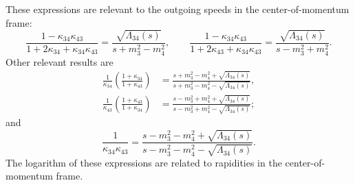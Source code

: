These expressions are relevant to the outgoing speeds in the center-of-momentum frame:
\begin{equation}
	\frac{1 - \kappa_{34} \kappa_{43}}{1 + 2 \kappa_{34} + \kappa_{34} \kappa_{43}} = \frac{\sqrt{\Lambda_{34}(s)}}{s + m_{3}^{2} - m_{4}^{2}}, \qquad \frac{1 - \kappa_{34} \kappa_{43}}{1 + 2 \kappa_{43} + \kappa_{34} \kappa_{43}} = \frac{\sqrt{\Lambda_{34}(s)}}{s - m_{3}^{2} + m_{4}^{2}}.
\end{equation}
Other relevant results are
\begin{align}
	\frac{1}{\kappa_{34}} \left( \frac{1 + \kappa_{34}}{1 + \kappa_{43}} \right) &= \frac{s + m_{3}^{2} - m_{4}^{2} + \sqrt{\Lambda_{34}(s)}}{s + m_{3}^{2} - m_{4}^{2} - \sqrt{\Lambda_{34}(s)}}, \\
	\frac{1}{\kappa_{43}} \left( \frac{1 + \kappa_{43}}{1 + \kappa_{34}} \right) &= \frac{s - m_{3}^{2} + m_{4}^{2} + \sqrt{\Lambda_{34}(s)}}{s - m_{3}^{2} + m_{4}^{2} - \sqrt{\Lambda_{34}(s)}};
\end{align}
and
\begin{equation}
	\frac{1}{\kappa_{34}\kappa_{43}} = \frac{s - m_{3}^{2} - m_{4}^{2} + \sqrt{\Lambda_{34}(s)}}{s - m_{3}^{2} - m_{4}^{2} - \sqrt{\Lambda_{34}(s)}}.
\end{equation}
The logarithm of these expressions are related to rapidities in the center-of-momentum frame.

